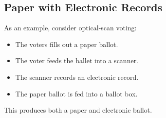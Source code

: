 \documentclass[12pt]{article}
\begin{document}
\subsection*{Paper with Electronic Records}

As an example, consider optical-scan voting:
\begin{itemize}
\item The voters fills out a paper ballot.
\item The voter feeds the ballet into a scanner.
\item The scanner records an electronic record.
\item The paper ballot is fed into a ballot box.
\end{itemize}

This produces both a paper and electronic ballot.
\end{document}
